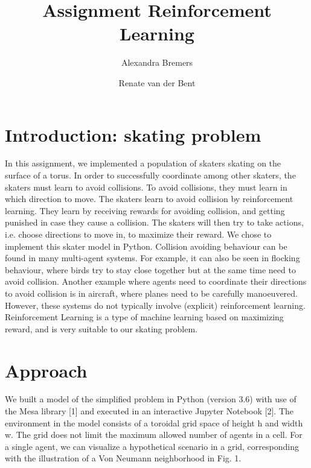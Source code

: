 \documentclass[a4paper]{article}
\title{Assignment Reinforcement Learning}
\author{Alexandra Bremers \and Renate van der Bent}
\begin{document}
\maketitle

\section{Introduction: skating problem}
In this assignment, we implemented a population of skaters skating on the surface of a torus. In order to successfully coordinate among other skaters, the skaters must learn to avoid collisions. To avoid collisions, they must learn in which direction to move. The skaters learn to avoid collision by reinforcement learning. They learn by receiving rewards for avoiding collision, and getting punished in case they cause a collision. The skaters will then try to take actions, i.e. choose directions to move in, to maximize their reward. We chose to implement this skater model in Python. Collision avoiding behaviour can be found in many multi-agent systems. For example, it can also be seen in flocking behaviour, where birds try to stay close together but at the same time need to avoid collision. Another example where agents need to coordinate their directions to avoid collision is in aircraft, where planes need to be carefully manoeuvered. However, these systems do not typically involve (explicit) reinforcement learning. Reinforcement Learning is a type of machine learning based on maximizing reward, and is very suitable to our skating problem. 

\section{Approach}
We built a model of the simplified problem in Python (version  3.6) with use of the Mesa library [1] and executed in an interactive Jupyter Notebook [2]. 
The environment in the model consists of a toroidal grid space of height h and width w. The grid does not limit the maximum allowed number of agents in a cell. For a single agent, we can visualize a hypothetical scenario in a grid, corresponding with the illustration of a Von Neumann neighborhood in Fig. 1.  
\end{document}

